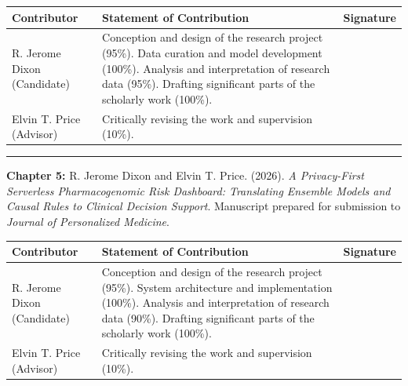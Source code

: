 \documentclass[
  12pt,
]{book}
\begin{document}
\begin{longtable}[]{@{}
  >{\raggedright\arraybackslash}p{}
  >{\raggedright\arraybackslash}p{}
  >{\raggedright\arraybackslash}p{}@{}}
\toprule\noalign{}
\begin{minipage}[b]{\linewidth}\raggedright
Contributor
\end{minipage} & \begin{minipage}[b]{\linewidth}\raggedright
Statement of Contribution
\end{minipage} & \begin{minipage}[b]{\linewidth}\raggedright
Signature
\end{minipage} \\
\midrule\noalign{}
\endhead
\bottomrule\noalign{}
\endlastfoot
R. Jerome Dixon (Candidate) & Conception and design of the research
project (95\%). Data curation and model development (100\%). Analysis
and interpretation of research data (95\%). Drafting significant parts
of the scholarly work (100\%). & \\
Elvin T. Price (Advisor) & Critically revising the work and supervision
(10\%). & \\
\end{longtable}

\begin{center}\rule{0.5\linewidth}{0.5pt}\end{center}

\textbf{Chapter 5:} R. Jerome Dixon and Elvin T. Price. (2026). \emph{A
Privacy-First Serverless Pharmacogenomic Risk Dashboard: Translating
Ensemble Models and Causal Rules to Clinical Decision Support}.
Manuscript prepared for submission to \emph{Journal of Personalized
Medicine}.

\begin{longtable}[]{@{}
  >{\raggedright\arraybackslash}p{}
  >{\raggedright\arraybackslash}p{}
  >{\raggedright\arraybackslash}p{}@{}}
\toprule\noalign{}
\begin{minipage}[b]{\linewidth}\raggedright
Contributor
\end{minipage} & \begin{minipage}[b]{\linewidth}\raggedright
Statement of Contribution
\end{minipage} & \begin{minipage}[b]{\linewidth}\raggedright
Signature
\end{minipage} \\
\midrule\noalign{}
\endhead
\bottomrule\noalign{}
\endlastfoot
R. Jerome Dixon (Candidate) & Conception and design of the research
project (95\%). System architecture and implementation (100\%). Analysis
and interpretation of research data (90\%). Drafting significant parts
of the scholarly work (100\%). & \\
Elvin T. Price (Advisor) & Critically revising the work and supervision
(10\%). & \\
\end{longtable}
\end{document}
